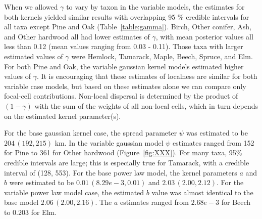 \documentclass[12pt]{article}
\begin{document}
When we allowed $\gamma$ to vary by taxon in the variable models, the
estimates for both kernels yielded similar results with overlapping 95
\% credible intervals for all taxa except Pine and Oak
(Table~\ref{table:gamma}). Birch, Other conifer, Ash, and Other
hardwood all had lower estimates of $\gamma$, with mean posterior
values all less than 0.12 (mean values ranging from 0.03 -
0.11). Those taxa with larger estimated values of $\gamma$ were
Hemlock, Tamarack, Maple, Beech, Spruce, and Elm. For both Pine and
Oak, the variable gaussian kernel models estimated higher values of
$\gamma$. It is encouraging that these estimates of localness are
similar for both variable case models, but based on these estimates
alone we can compare only focal-cell contributions. Non-local
dispersal is determined by the product of $(1-\gamma)$ with the sum of
the weights of all non-local cells, which in turn depends on the
estimated kernel parameter(s).

For the base gaussian kernel case, the spread parameter $\psi$ was
estimated to be $204\,(192, 215)$ km. In the variable gaussian model
$\psi$ estimates ranged from 152 for Pine to 361 for Other hardwood
(Figure~\ref{fig:XXX}). For many taxa, 95\% credible intervals are large;
this is especially true for Tamarack, with a credible interval of
(128, 553). For the base power law model, the kernel parameters $a$
and $b$ were estimated to be $0.01\,(8.29e-3, 0.01)$ and $2.03\,(2.00,
2.12)$. For the variable power law model case, the estimated $b$ value
was almost identical to the base model $2.06\,(2.00, 2.16)$. The $a$
estimates ranged from $2.68e-3$ for Beech to $0.203$ for Elm.
\end{document}
